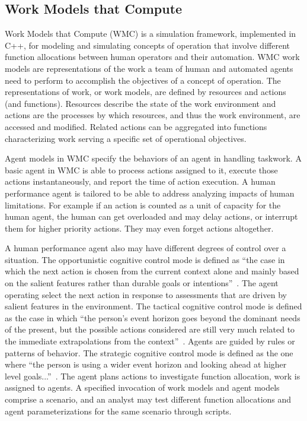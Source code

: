 \documentclass[journal]{IEEEtran}
\begin{document}
\subsection{Work Models that Compute}


Work Models that Compute (WMC) is a simulation framework, implemented in C++, for modeling and simulating concepts of operation that involve different function allocations between human operators and their automation. WMC work models are representations of the work a team of human and automated agents need to perform to accomplish the objectives of a concept of operation. The representations of work, or work models, are defined by resources and actions (and functions). Resources describe
the state of the work environment and actions
are the processes by which resources, and thus
the work environment, are accessed and
modified. Related actions can be aggregated into functions characterizing work serving a specific set of operational objectives.

Agent models in WMC specify the behaviors of an agent in handling taskwork. A basic agent in WMC is able to process actions assigned to it, execute those actions instantaneously, and report the time of action execution. A human performance agent is tailored to be able to address analyzing impacts of human limitations. For example if an action is counted as a unit of capacity for the human agent, the human can get overloaded and may delay actions, or interrupt them for higher priority actions. They may even forget actions altogether.

A human performance agent also may have different degrees of control over a situation. The opportunistic cognitive control mode is defined as ``the case in which the next action is chosen from the current context alone and mainly based on the salient features rather than durable goals or intentions''~\cite{Hollnagel1993}. The agent operating select the next action in response to assessments that are driven by salient features in the environment. The tactical cognitive control mode is defined as the case in which ``the person’s event horizon goes beyond the dominant needs of the present, but the possible actions considered are still very much related to the immediate extrapolations from the context''~\cite[p170]{Hollnagel1993}. Agents are guided by rules or patterns of behavior. The strategic cognitive control mode is defined as the one where ``the person is using a wider event horizon and looking ahead at higher level goals...''~\cite{Hollnagel1993}. The agent plans actions
to investigate function allocation, work is assigned to agents. A specified invocation of work models and agent models comprise a scenario, and an analyst may test different function allocations and agent parameterizations for the same scenario through scripts.
\end{document}
